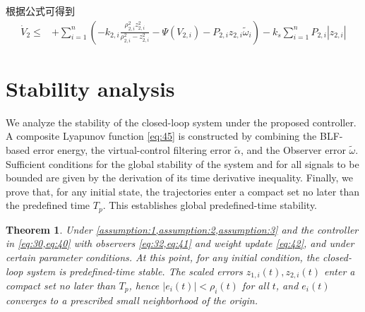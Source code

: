 \documentclass[pdflatex,sn-mathphys-num]{sn-jnl}%
\theoremstyle{thmstyleone}%
\newtheorem{theorem}{Theorem}%
\theoremstyle{thmstyletwo}%
\theoremstyle{thmstylethree}%
\begin{document}



根据公式可得到
\begin{equation}
	\begin{aligned}
	\dot V_2
\le&+\sum_{i=1}^n \left( - k_{2,i}\frac{\rho_{2,i}^2 z_{2,i}^2}{\rho_{2,i}^2-z_{2,i}^2}-\Psi(V_{2,i})-P_{2,i}z_{2,i}\tilde{\omega}_i  \right) -k_s\sum_{i=1}^n P_{2,i} \left\lvert z_{2,i}\right\rvert
\end{aligned}
\end{equation}




\section{Stability analysis}

 We analyze the stability of the closed-loop system under the proposed controller. A composite Lyapunov function \cref{eq:45} is constructed by combining the BLF-based error energy, the virtual-control filtering error $\tilde\alpha$, and the Observer error $\tilde\omega$.  Sufficient conditions for the global stability of the system and for all signals to be bounded are given by the derivation of its time derivative inequality. Finally, we prove that, for any initial state, the trajectories enter a compact set no later than the predefined time $T_p$. This establishes global predefined-time stability.

 \begin{theorem}
	Under \cref{assumption:1,assumption:2,assumption:3} and the controller in \cref{eq:30,eq:40} with observers \cref{eq:32,eq:41} and weight update \cref{eq:42}, and under certain parameter conditions. At this point, for any initial condition, the closed-loop system is predefined-time stable. The scaled errors $z_{1,i}(t),z_{2,i}(t)$ enter a compact set no later than $T_p$, hence $|e_{i}(t)|<\rho_{i}(t)$ for all $t$, and $e_i(t)$ converges to a prescribed small neighborhood of the origin.
\end{theorem}
\end{document}
